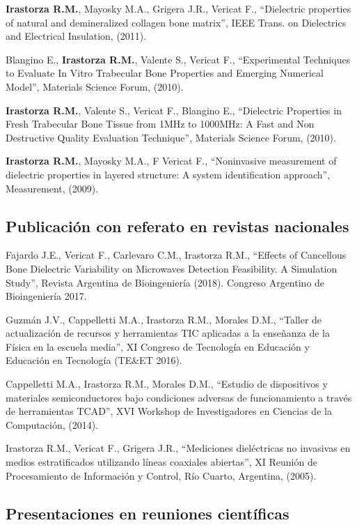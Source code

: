 \documentclass[margin,line]{res}
\begin{document}
\begin{resume}
\textbf{Irastorza R.M.}, Mayosky M.A., Grigera J.R., Vericat F., ``Dielectric properties of natural and demineralized collagen bone matrix'', IEEE Trans. on Dielectrics and Electrical Insulation, (2011).

Blangino E., {\bf Irastorza R.M.}, Valente S., Vericat F., ``Experimental Techniques to Evaluate In Vitro Trabecular Bone Properties and Emerging Numerical Model'', Materials Science Forum, (2010).

{\bf Irastorza R.M.}, Valente S., Vericat F., Blangino E., ``Dielectric Properties in Fresh Trabecular Bone Tissue from 1MHz to 1000MHz: A Fast and Non Destructive Quality Evaluation Technique'', Materials Science Forum, (2010).

{\bf Irastorza R.M.}, Mayosky M.A., F Vericat F., ``Noninvasive measurement of dielectric properties in layered structure: A system identification approach'', Measurement, (2009).

\subsection{ Publicación con referato en revistas nacionales}

Fajardo J.E., Vericat F., Carlevaro C.M., Irastorza R.M., ``Effects of Cancellous Bone Dielectric Variability on Microwaves Detection Feasibility. A Simulation Study'', Revista Argentina de Bioingeniería  (2018). Congreso Argentino de Bioingeniería 2017.

Guzmán J.V., Cappelletti M.A., Irastorza R.M., Morales D.M., ``Taller de actualización de recursos y herramientas TIC aplicadas a la enseñanza de la Física en la escuela media'', XI Congreso de Tecnología en Educación y Educación en Tecnología (TE\&ET 2016).

Cappelletti M.A., Irastorza R.M., Morales D.M., ``Estudio de dispositivos y materiales semiconductores bajo condiciones adversas de funcionamiento a través de herramientas TCAD'', XVI Workshop de Investigadores en Ciencias de la Computación, (2014).

Irastorza R.M., Vericat F., Grigera J.R., ``Mediciones dieléctricas no invasivas en medios estratificados utilizando líneas coaxiales abiertas'', XI Reunión de Procesamiento de Información y Control, Río Cuarto, Argentina, (2005).

\subsection{ Presentaciones en reuniones científicas}


\end{resume}
\end{document}
